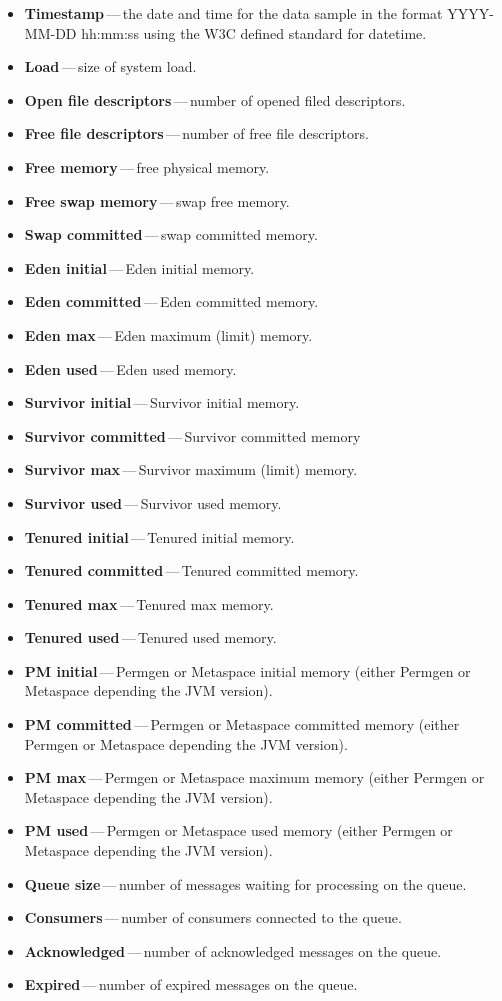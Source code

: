 \begin{itemize}
	\setlength\itemsep{0em}
	\item \textbf{Timestamp}\,---\,the date and time for the data sample in the format YYYY-MM-DD hh:mm:ss using the W3C defined standard for datetime.
	\item \textbf{Load}\,---\,size of system load.
	\item \textbf{Open file descriptors}\,---\,number of opened filed descriptors.
	\item \textbf{Free file descriptors}\,---\,number of free file descriptors.
	\item \textbf{Free memory}\,---\,free physical memory.
	\item \textbf{Free swap memory}\,---\,swap free memory.
	\item \textbf{Swap committed}\,---\,swap committed memory.
	\item \textbf{Eden initial}\,---\,Eden initial memory.
	\item \textbf{Eden committed}\,---\,Eden committed memory.
	\item \textbf{Eden max}\,---\,Eden maximum (limit) memory.
	\item \textbf{Eden used}\,---\,Eden used memory.
	\item \textbf{Survivor initial}\,---\,Survivor initial memory.
	\item \textbf{Survivor committed}\,---\,Survivor committed memory
	\item \textbf{Survivor max}\,---\,Survivor maximum (limit) memory.
	\item \textbf{Survivor used}\,---\,Survivor used memory.
	\item \textbf{Tenured initial}\,---\,Tenured initial memory.
	\item \textbf{Tenured committed}\,---\,Tenured committed memory.
	\item \textbf{Tenured max}\,---\,Tenured max memory.
	\item \textbf{Tenured used}\,---\,Tenured used memory.
	\item \textbf{PM initial}\,---\,Permgen or Metaspace initial memory (either Permgen or Metaspace depending the JVM version).
	\item \textbf{PM committed}\,---\,Permgen or Metaspace committed memory (either Permgen or Metaspace depending the JVM version).
	\item \textbf{PM max}\,---\,Permgen or Metaspace maximum memory (either Permgen or Metaspace depending the JVM version).
	\item \textbf{PM used}\,---\,Permgen or Metaspace used memory (either Permgen or Metaspace depending the JVM version).
	\item \textbf{Queue size}\,---\,number of messages waiting for processing on the queue.
	\item \textbf{Consumers}\,---\,number of consumers connected to the queue.
	\item \textbf{Acknowledged}\,---\,number of acknowledged messages on the queue.
	\item \textbf{Expired}\,---\,number of expired messages on the queue.
\end{itemize}

